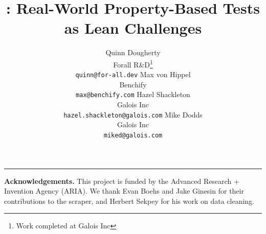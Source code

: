 \documentclass{article}
\title{\FVSpec: Real-World Property-Based Tests as Lean Challenges}
\author{
  Quinn Dougherty\\
  Forall R\&D\thanks{Work completed at Galois Inc}\\
  \texttt{quinn@for-all.dev}
  \And
  Max von Hippel\\
  Benchify\\
  \texttt{max@benchify.com}
  \And
  Hazel Shackleton\\
  Galois Inc\\
  \texttt{hazel.shackleton@galois.com}
  \And
  Mike Dodds\\
  Galois Inc\\
  \texttt{miked@galois.com}
}
\begin{document}
\maketitle












\medskip\noindent\hrule\medskip
\noindent\textbf{Acknowledgements.}
This project is funded by the Advanced Research + Invention Agency (ARIA). We thank Evan Boehs and Jake Ginesin for their contributions to the scraper, and Herbert Sekpey for his work on data cleaning.






\appendix




% 
\end{document}
